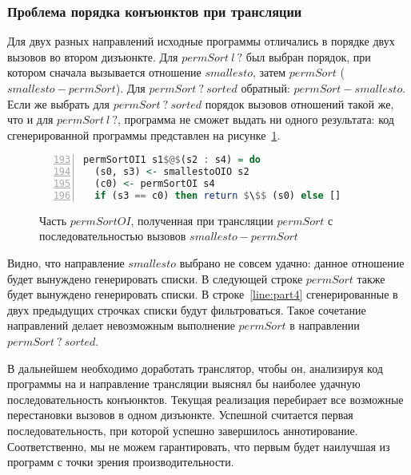 \subsubsection{Проблема порядка конъюнктов при трансляции}
\label{lab:sortProblem}

Для двух разных направлений исходные программы отличались в порядке двух вызовов во втором дизъюнкте. 
Для $permSort \ l \ ?$ был выбран порядок, при котором сначала вызывается отношение $smallesto$, затем $permSort$ ($smallesto-permSort$).
Для $permSort \ ? \ sorted$ обратный: $permSort-smallesto$.
Если же выбрать для $permSort \ ? \ sorted$ порядок вызовов отношений такой же, что и для $permSort \ l \ ?$, программа не сможет выдать ни одного результата: код сгенерированной программы представлен на рисунке~\ref{lst:part}.

\begin{figure}[h!]
  \begin{center}
  \begin{minipage}{0.55\textwidth}
  \begin{lstlisting}[language=Haskell, frame=single, numbers=left,numberstyle=\small, firstnumber=193, escapechar=|]
  permSortOI1 s1$@$(s2 : s4) = do
  (s0, s3) <- smallestoOIO s2
  (c0) <- permSortOI s4
  if (s3 == c0) then return $\$$ (s0) else []        |\label{line:part4}|
  \end{lstlisting}
  \end{minipage}
  \end{center}
  \caption{Часть $permSortOI$, полученная при трансляции $permSort$ с последовательностью вызовов $smallesto-permSort$}
  \label{lst:part}
\end{figure}

Видно, что направление $smallesto$ выбрано не совсем удачно: данное отношение будет вынуждено генерировать списки.
В следующей строке $permSort$ также будет вынуждено генерировать списки.
В строке~\ref{line:part4} сгенерированные в двух предыдущих строчках списки будут фильтроваться.
Такое сочетание направлений делает невозможным выполнение $permSort$ в направлении $permSort \ ? \ sorted$.

В дальнейшем необходимо доработать транслятор, чтобы он, анализируя код программы на \miniKanren{} и направление трансляции выяснял бы наиболее удачную последовательность конъюнктов. 
Текущая реализация перебирает все возможные перестановки вызовов в одном дизъюнкте.
Успешной считается первая последовательность, при которой успешно завершилось аннотирование.
Соответственно, мы не можем гарантировать, что первым будет наилучшая из программ с точки зрения производительности. 
